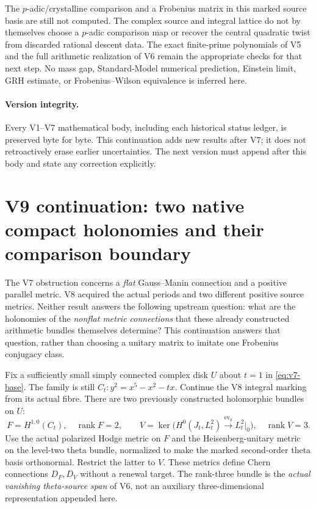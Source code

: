 \documentclass[11pt]{article}
\theoremstyle{definition}
\theoremstyle{remark}
\newcommand{\rank}{\operatorname{rank}}
\begin{document}
The $p$-adic/crystalline comparison and a Frobenius matrix in this marked
source basis are still not computed. The complex source and integral lattice
do not by themselves choose a $p$-adic comparison map or recover the central
quadratic twist from discarded rational descent data. The exact finite-prime
polynomials of V5 and the full arithmetic realization of V6 remain the
appropriate checks for that next step. No mass gap, Standard-Model numerical
prediction, Einstein limit, GRH estimate, or Frobenius--Wilson equivalence is
inferred here.

\paragraph{Version integrity.}
Every V1--V7 mathematical body, including each historical status ledger, is
preserved byte for byte. This continuation adds new results after V7; it
does not retroactively erase earlier uncertainties. The next version must
append after this body and state any correction explicitly.
\clearpage
\section{V9 continuation: two native compact holonomies and their comparison boundary}
\label{sec:v9-context}

The V7 obstruction concerns a \emph{flat} Gauss--Manin connection and a
positive parallel metric. V8 acquired the actual periods and two different
positive source metrics. Neither result answers the following upstream
question: what are the holonomies of the \emph{nonflat metric connections}
that these already constructed arithmetic bundles themselves determine?
This continuation answers that question, rather than choosing a unitary
matrix to imitate one Frobenius conjugacy class.

Fix a sufficiently small simply connected complex disk $U$ about $t=1$ in
\cref{eq:v7-base}. The family is still
$C_t:y^2=x^5-x^2-tx$. Continue the V8 integral marking from its actual fibre.
There are two previously constructed holomorphic bundles on $U$:
\[
 F=H^{1,0}(C_t),\quad \rank F=2,
 \qquad
 V=\ker\bigl(H^0(J_t,L_t^2)\xrightarrow{\mathrm{ev}_0}L_t^2|_0\bigr),
 \quad\rank V=3.
\]
Use the actual polarized Hodge metric on $F$ and the Heisenberg-unitary
metric on the level-two theta bundle, normalized to make the marked
second-order theta basis orthonormal. Restrict the latter to $V$. These
metrics define Chern connections $D_F,D_V$ without a renewal target.
The rank-three bundle is the \emph{actual vanishing theta-source span} of
V6, not an auxiliary three-dimensional representation appended here.
\end{document}
